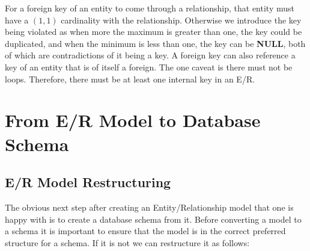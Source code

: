 \documentclass{report}
\begin{document}
For a foreign key of an entity to come through a relationship, that entity must have a $(1,1)$ cardinality with the relationship. Otherwise we introduce the key being violated as when more the maximum is greater than one, the key could be duplicated, and when the minimum is less than one, the key can be \textbf{NULL}, both of which are contradictions of it being a key. A foreign key can also reference a key of an entity that is of itself a foreign. The one caveat is there must not be loops. Therefore, there must be at least one internal key in an E/R.


\section{From E/R Model to Database Schema}
\subsection{E/R Model Restructuring}
The obvious next step after creating an Entity/Relationship model that one is happy with is to create a database schema from it. Before converting a model to a schema it is important to ensure that the model is in the correct preferred structure for a schema. If it is not we can restructure it as follows:
\end{document}
